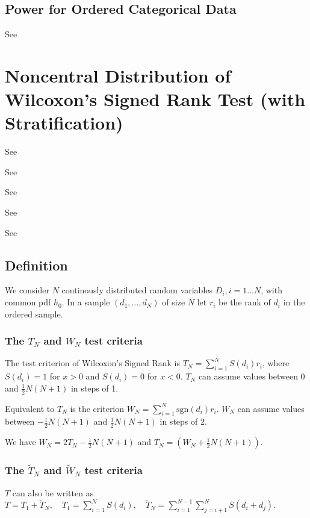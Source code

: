 \subsection{Power for Ordered Categorical Data}

See \cite{Kolassa1995}


\newpage
\section{Noncentral Distribution of Wilcoxon's Signed Rank Test (with Stratification)}

See \cite{Good_2005}

See \cite{Wang_2003_Rank}

See \cite{Govindarajulu_2007}

See \cite{Shieh_2007}

See \cite{Agresti_2010}

\subsection{Definition}
\label{WilcoxonWDistributionDefinition}

We consider $N$ continously distributed random variables $D_i,i=1\ldots N$, with common pdf $h_0$. In a sample $(d_1,\ldots,d_N)$ of size $N$ let $r_i$ be the rank of $d_i$ in the ordered sample.

\subsubsection{The $T_N$ and $W_N$ test criteria}
The test criterion of Wilcoxon's Signed Rank is $T_N=\sum_{i=1}^N S(d_i)r_i$, where $S(d_i)=1$ for $x>0$ and $S(d_i)=0$ for $x<0$.
$T_N$ can assume values between 0 and $\tfrac{1}{2}N(N+1)$ in steps of 1.

Equivalent to $T_N$ is the criterion $W_N=\sum_{i=1}^N \text{sgn}(d_i)r_i$. $W_N$ can assume values between $-\tfrac{1}{2}N(N+1)$ and $\tfrac{1}{2}N(N+1)$ in steps of 2. 

We have $W_N=2T_N-\tfrac{1}{2}N(N+1)$ and $T_N=(W_N+\tfrac{1}{2}N(N+1))$.


\subsubsection{The $\widetilde{T}_N$ and $\widetilde{W}_N$ test criteria}
$T$ can also be written as $T=T_1+\widetilde{T}_N, \quad T_1=\sum_{i=1}^N S(d_i), \quad \widetilde{T}_N=\sum_{i=1}^{N-1} \sum_{j=i+1}^N S(d_i+d_j)$.

